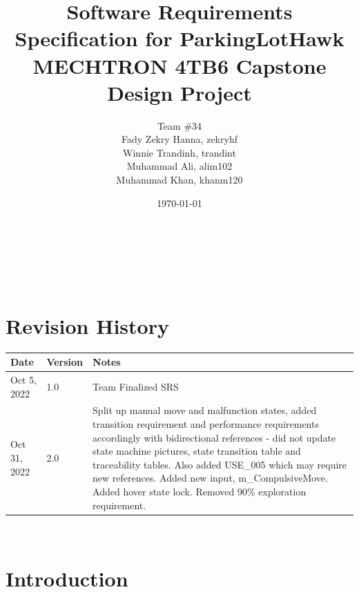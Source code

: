 \documentclass{article}
\begin{document}
\title{
Software Requirements Specification for ParkingLotHawk \\
  \large MECHTRON 4TB6 Capstone Design Project 
    }

\author{\authname Team \#34 \\
Fady Zekry Hanna, zekryhf \\
Winnie Trandinh, trandint \\
Muhammad Ali, alim102 \\
Muhammad Khan, khanm120}

\date{\today}
	
\maketitle

~\newpage


\tableofcontents

~\newpage

\section*{Revision History}

\begin{tabularx}{\textwidth}{p{3cm}p{2cm}X} 
\toprule {\bf Date} & {\bf Version} & {\bf Notes}\\
\midrule
Oct 5, 2022 & 1.0 & Team Finalized SRS\\

\bottomrule
Oct 31, 2022 & 2.0 & Split up manual move and malfunction states, added transition requirement and performance requirements accordingly with bidirectional references - did not update state machine pictures, state transition table and traceability tables. Also added USE\_005 which may require new references. Added new input, m\_CompulsiveMove. Added hover state lock. Removed 90\% exploration requirement. 
\\

\bottomrule
\end{tabularx}

~\newpage


\section{Introduction}
\label{sec:Intro}
\end{document}
